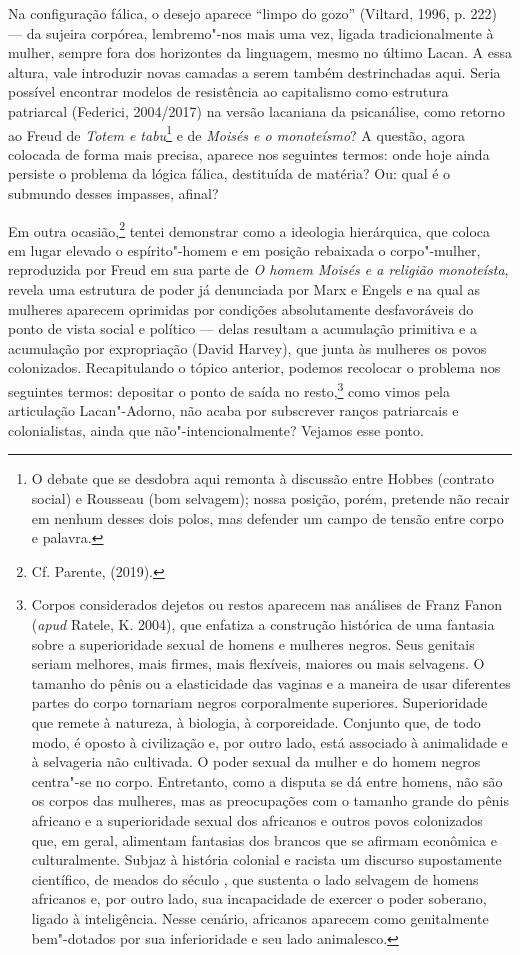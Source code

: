 Na configuração fálica, o desejo aparece ``limpo do gozo'' (Viltard,
1996, p. 222) --- da sujeira corpórea, lembremo"-nos mais uma vez, ligada
tradicionalmente à mulher, sempre fora dos horizontes da linguagem,
mesmo no último Lacan. A essa altura, vale introduzir novas camadas a
serem também destrinchadas aqui. Seria possível encontrar modelos de
resistência ao capitalismo como estrutura patriarcal (Federici,
2004/2017) na versão lacaniana da psicanálise, como retorno ao Freud de
\emph{Totem e tabu}\footnote{O debate que se desdobra aqui remonta à
  discussão entre Hobbes (contrato social) e Rousseau (bom selvagem);
  nossa posição, porém, pretende não recair em nenhum desses dois polos,
  mas defender um campo de tensão entre corpo e palavra.} e de
\emph{Moisés e o monoteísmo}? A questão, agora colocada de forma mais
precisa, aparece nos seguintes termos: onde hoje ainda persiste o
problema da lógica fálica, destituída de matéria? Ou: qual é o submundo
desses impasses, afinal?

Em outra ocasião,\footnote{Cf. Parente,  (2019).} tentei demonstrar
como a ideologia hierárquica, que coloca em lugar elevado o
espírito"-homem e em posição rebaixada o corpo"-mulher, reproduzida por
Freud em sua parte  de \emph{O homem Moisés e a religião monoteísta},
revela uma estrutura de poder já denunciada por Marx e Engels e na qual
as mulheres aparecem oprimidas por condições absolutamente desfavoráveis
do ponto de vista social e político --- delas resultam a acumulação
primitiva e a acumulação por expropriação (David Harvey), que junta às
mulheres os povos colonizados. Recapitulando o tópico anterior, podemos
recolocar o problema nos seguintes termos: depositar o ponto de saída no
resto,\footnote{Corpos considerados dejetos ou restos aparecem nas
  análises de Franz Fanon (\emph{apud} Ratele, K. 2004), que enfatiza a
  construção histórica de uma fantasia sobre a superioridade sexual de
  homens e mulheres negros. Seus genitais seriam melhores, mais firmes,
  mais flexíveis, maiores ou mais selvagens. O tamanho do pênis ou a
  elasticidade das vaginas e a maneira de usar diferentes partes do
  corpo tornariam negros corporalmente superiores. Superioridade que
  remete à natureza, à biologia, à corporeidade. Conjunto que, de todo
  modo, é oposto à civilização e, por outro lado, está associado à
  animalidade e à selvageria não cultivada. O poder sexual da mulher e
  do homem negros centra"-se no corpo. Entretanto, como a disputa se dá
  entre homens, não são os corpos das mulheres, mas as preocupações com
  o tamanho grande do pênis africano e a superioridade sexual dos
  africanos e outros povos colonizados que, em geral, alimentam
  fantasias dos brancos que se afirmam econômica e culturalmente. Subjaz
  à história colonial e racista um discurso supostamente científico, de
  meados do século , que sustenta o lado selvagem de homens africanos
  e, por outro lado, sua incapacidade de exercer o poder soberano,
  ligado à inteligência. Nesse cenário, africanos aparecem como
  genitalmente bem"-dotados por sua inferioridade e seu lado animalesco.}
como vimos pela articulação Lacan"-Adorno, não acaba por subscrever
ranços patriarcais e colonialistas, ainda que não"-intencionalmente?
Vejamos esse ponto.

